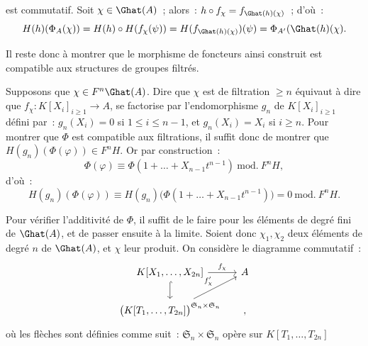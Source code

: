 
est
commutatif. Soit \(\chi\in\Ghat(A)\)~; alors~: \(h\circ f_\chi=f_{\Ghat(h)(\chi)}\)~; d'où~:
\[
  H(h)(\Phi_A(\chi))=H(h)\circ H(f_\chi(\psi))
  =H(f_{\Ghat(h)(\chi)})(\psi)=\Phi_{A'}(\Ghat(h)(\chi).
\]

Il reste donc à montrer que le morphisme de foncteurs ainsi construit est compatible aux structures de groupes filtrés.

Supposons que \(\chi\in F^n\Ghat(A)\). Dire que \(\chi\) est de filtration \(\geq n\) équivaut à dire que \(f_\chi:K[X_i]_{i\geq 1}\to A\), se factorise par l'endomorphisme \(g_n\) de \(K[X_i]_{i\geq 1}\) défini par~: \(g_n(X_i)=0\) si \(1\leq i\leq n-1\), et \(g_n(X_i)=X_i\) si \(i\geq n\).
Pour montrer que \(\Phi\) est compatible aux filtrations, il suffit donc de montrer que \(H(g_n)(\Phi(\varphi))\in F^nH\). Or par construction~:
\[
  \Phi(\varphi)\equiv \Phi(1+\ldots+X_{n-1}t^{n-1})\ \mathrm{mod.}\ F^nH,
\]
d'où~:
\[
  H(g_n)(\Phi(\varphi))
  \equiv H(g_n)\bigl(\Phi(1+\ldots+X_{n-1}t^{n-1})\bigr)
  =0\ \mathrm{mod.}\ F^nH.
\]

Pour vérifier l'additivité de \(\Phi\), il suffit de le faire pour les éléments de degré fini de \(\Ghat(A)\), et de passer ensuite à la limite. Soient donc \(\chi_1,\chi_2\) deux éléments de degré \(n\) de \(\Ghat(A)\), et \(\chi\) leur produit. On considère le diagramme commutatif~:
\[
\begin{tikzcd}[column sep=tiny]
K[X_1,\ldots,X_{2n}] \arrow[rr,"f_\chi"] \arrow[d,hook] && A\\
\bigl(K[T_1,\ldots,T_{2n}]\bigr)^{\mathfrak S_n\times\mathfrak S_n}
\arrow[urr,"f'_\chi"] && ,
\end{tikzcd}
\]
où les flèches sont définies comme suit~: \(\mathfrak S_n\times\mathfrak S_n\) opère sur \(K[T_1,\ldots,T_{2n}]\) 
